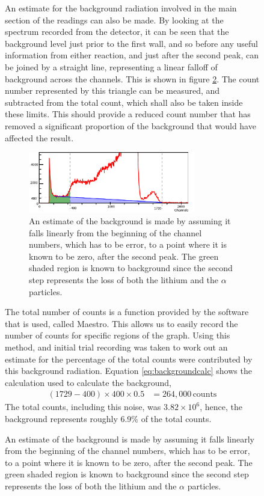 \begin{figure}[ht]
An estimate for the background radiation involved in the main section of the readings can also be made. By looking at the spectrum recorded from the detector, it can be seen that the background level just prior to the first wall, and so before any useful information from either reaction, and just after the second peak, can be joined by a straight line, representing a linear falloff of background across the channels. This is shown in figure \ref{fig:bf3errorest}. The count number represented by this triangle can be measured, and subtracted from the total count, which shall also be taken inside these limits. This should provide a reduced count number that has removed a significant proportion of the background that would have affected the result.
\begin{figure}[ht]
  \centering
  \includegraphics[width=0.8\textwidth]{BF3background.pdf}
  \caption{An estimate of the background is made by assuming it falls linearly from the beginning of the channel numbers, which has to be error, to a point where it is known to be zero, after the second peak. The green shaded region is known to background since the second step represents the loss of both the lithium and the $\alpha$ particles. \label{fig:bf3errorest}}
\end{figure}

The total number of counts is a function provided by the software that is used, called Maestro. This allows us to easily record the number of counts for specific regions of the graph. Using this method, and initial trial recording was taken to work out an estimate for the percentage of the total counts were contributed by this background radiation. Equation \ref{eq:backgroundcalc} shows the calculation used to calculate the background,
\begin{align}
  (1729-400)\times 400 \times 0.5 &= 264,000\,\text{counts} \label{eq:backgroundcalc}
\end{align}
The total counts, including this noise, was $3.82\times10^6$, hence, the background represents roughly 6.9\% of the total counts.


\end{figure}
